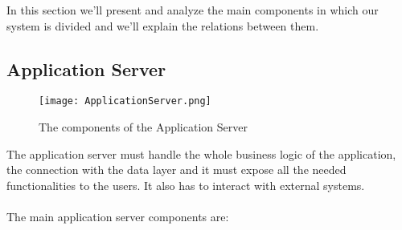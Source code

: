 In this section we'll present and analyze the main components in which our system is divided and we'll explain the relations between them.
		
\subsection{Application Server}
\label{subsect:Application Server}
	\begin{figure}[H]
		\begin{center}
			\hspace*{-60pt}
			\texttt{[image: ApplicationServer.png]}
		\end{center}
		\caption{The components of the Application Server}
	\end{figure}
	The application server must handle the whole business logic of the application, the connection with the data layer and it must expose all the needed functionalities to the users. It also has to interact with external systems. \\ \\
The main application server components are:

